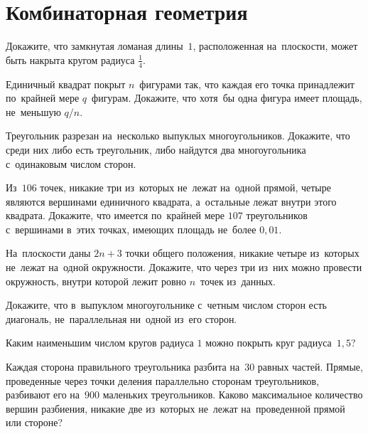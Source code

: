
\section*{Комбинаторная геометрия}


\begin{problems}

\item
Докажите, что замкнутая ломаная длины~$1$, расположенная на~плоскости, может
быть накрыта кругом радиуса $\frac{1}{4}$.

\item
Единичный квадрат покрыт $n$~фигурами так, что каждая его точка принадлежит
по~крайней мере $q$~фигурам.
Докажите, что хотя~бы одна фигура имеет площадь, не~меньшую $q / n$.

\item
Треугольник разрезан на~несколько выпуклых многоугольников.
Докажите, что среди них либо есть треугольник, либо найдутся два многоугольника
с~одинаковым числом сторон.

\item
Из~$106$ точек, никакие три из~которых не~лежат на~одной прямой, четыре
являются вершинами единичного квадрата, а~остальные лежат внутри этого
квадрата.
Докажите, что имеется по~крайней мере $107$ треугольников с~вершинами в~этих
точках, имеющих площадь не~более $0{,}01$.

\item
На~плоскости даны $2 n + 3$ точки общего положения, никакие четыре из~которых
не~лежат на~одной окружности.
Докажите, что через три из~них можно провести окружность, внутри которой лежит
ровно $n$~точек из~данных.

\item
Докажите, что в~выпуклом многоугольнике с~четным числом сторон есть диагональ,
не~параллельная ни~одной из~его сторон.

\item
Каким наименьшим числом кругов радиуса $1$ можно покрыть круг радиуса~$1{,}5$?

\item
Каждая сторона правильного треугольника разбита на~$30$ равных частей.
Прямые, проведенные через точки деления параллельно сторонам треугольников,
разбивают его на~$900$ маленьких треугольников.
Каково максимальное количество вершин разбиения, никакие две из~которых
не~лежат на~проведенной прямой или стороне?

\end{problems}


